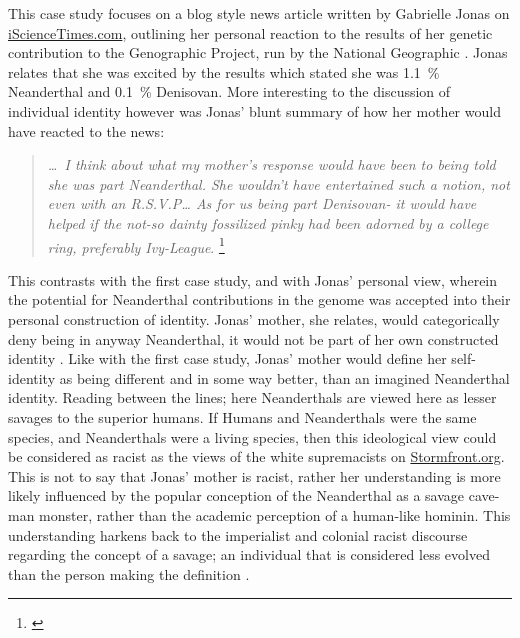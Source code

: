 
This case study focuses on a blog style news article written by Gabrielle Jonas on \href{www.iScienceTimes.com}{iScienceTimes.com}, outlining her personal reaction to the results of her genetic contribution to the Genographic Project, run by the National Geographic \parencite{Jonas_2014}. Jonas relates that she was excited by the results which stated she was \SI{1.1}{\percent} Neanderthal and \SI{0.1}{\percent} Denisovan. 
More interesting to the discussion of individual identity however was Jonas’ blunt summary of how her mother would have reacted to the news:

\blockquote{\textit{\ldots\ I think about what my mother’s response would have been to being told she was part Neanderthal. She wouldn’t have entertained such a notion, not even with an R.S.V.P… As for us being part Denisovan- it would have helped if the not-so dainty fossilized pinky had been adorned by a college ring, preferably Ivy-League}. 
	\footnote{\textcite{Jonas_2014}}}
This contrasts with the first case study, and with Jonas’ personal view, wherein the potential for Neanderthal contributions in the genome was accepted into their personal construction of identity. Jonas’ mother, she relates, would categorically deny being in anyway Neanderthal, it would not be part of her own constructed identity \parencite{Jonas_2014}. Like with the first case study, Jonas’ mother would define her self-identity as being different and in some way better, than an imagined Neanderthal identity. Reading between the lines; here Neanderthals are viewed here as lesser savages to the superior humans. If Humans and Neanderthals were the same species, and Neanderthals were a living species, then this ideological view could be considered as racist as the views of the white supremacists on \url{Stormfront.org}. This is not to say that Jonas’ mother is racist, rather her understanding is more likely influenced by the popular conception of the Neanderthal as a savage cave-man monster, rather than the academic perception of a human-like hominin. This understanding harkens back to the imperialist and colonial racist discourse regarding the concept of a savage; an individual that is considered less evolved than the person making the definition \parencite{Ellingson_2001}.  

